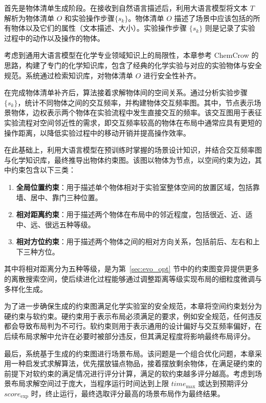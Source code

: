 首先是物体清单生成阶段。在接收到自然语言描述后，利用大语言模型将文本 $T$ 解析为物体清单 $O$ 和实验操作步骤$\{s_k\}$。物体清单 $O$ 描述了场景中应该包括的所有物体以及它们的属性（文本描述、大小）。实验操作步骤 $\{s_k\}$ 则是记录了实验过程中的动作以及操作的物体。

考虑到通用大语言模型在化学专业领域知识上的局限性，本章参考 ChemCrow\cite{bran2024chemcrow} 的思路，构建了专门的化学知识库，包含了经典的化学实验与对应的实验物体与安全规范。系统通过检索知识库，对物体清单 $O$ 进行安全性补齐。

在完成物体清单补齐后，算法接着求解物体间的空间关系。通过分析实验步骤 $\{s_k\}$，统计不同物体之间的交互频率，并构建物体交互频率图。其中，节点表示场景物体，边权表示两个物体在实验流程中发生直接交互的频率。该交互图用于表征实验流程对空间邻近性的需求，即交互频率较高的物体在布局中通常应具有更短的操作距离，以降低实验过程中的移动开销并提高操作效率。

在此基础上，利用大语言模型在预训练时掌握的场景设计知识，并结合交互频率图与化学知识库，最终推导出物体约束图。该图以物体为节点，以空间约束为边，其中约束包含以下三类：
\begin{enumerate}
\item \textbf{全局位置约束}：用于描述单个物体相对于实验室整体空间的放置区域，包括靠墙、居中、靠门三种位置。
\item \textbf{相对距离约束}：用于描述两个物体在布局中的邻近程度，包括很近、近、适中、远、很远五种等级。
\item \textbf{相对方位约束}：用于描述两个物体之间的相对方向关系，包括前后、左右和上下三种方位。
\end{enumerate}

其中将相对距离分为五种等级，是为第~\ref{sec:evo_opt} 节中的约束图变异提供更多的离散搜索空间，使后续进化过程能够通过调整距离等级实现布局的细粒度微调与多样化生成。

为了进一步确保生成的约束图满足化学实验室的安全规范，本章将空间约束划分为硬约束与软约束。硬约束用于表示布局必须满足的要求，例如安全规范，任何违反都会导致布局判为不可行。软约束则用于表示通用的设计偏好与交互频率偏好，在后续布局求解中允许在必要时被部分违反，但其满足程度将影响最终布局评分。

最后，系统基于生成的约束图进行场景布局。该问题是一个组合优化问题，本章采用一种启发式求解算法，优先摆放锚点物品，接着摆放剩余物体，在满足硬约束的前提下对软约束的满足情况进行评分计算，满足的软约束越多评分越高。考虑到场景布局求解空间过于庞大，当程序运行时间达到上限 $time_{\max}$ 或达到预期评分 $score_{\text{exp}}$ 时，终止运行，最终选取评分最高的场景布局作为最终结果。



